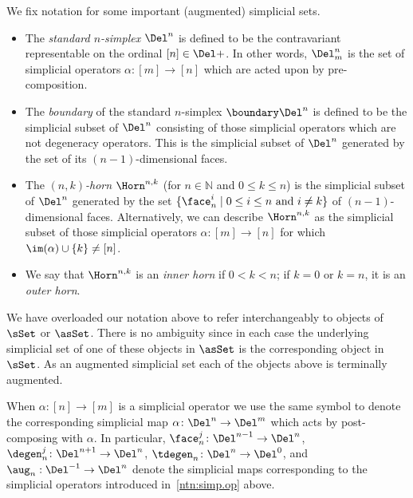     \begin{ntn}

        We fix notation for some important (augmented) simplicial sets. 
        \begin{itemize}
            \item The {\em standard $n$-simplex\/} $\Del^n$ is defined to be the contravariant representable on the ordinal $[n]\in\Del+$. In other words, $\Del^n_m$ is the set of simplicial operators $\alpha\colon[m]\to[n]$ which are acted upon by pre-composition.
            \item The {\em boundary\/} of the standard $n$-simplex $\boundary\Del^n$ is defined to be the simplicial subset of $\Del^n$ consisting of those simplicial operators which are not degeneracy operators. This is the simplicial subset of $\Del^n$ generated by the set of its $(n-1)$-dimensional faces.
            \item The {\em $(n,k)$-horn\/} $\Horn^{n,k}$ (for $n\in\mathbb{N}$ and $0\leq k\leq n$) is the simplicial subset of $\Del^n$ generated by the set $\{\face^i_n\mid 0\leq i\leq n \text{ and } i\neq k\}$ of $(n-1)$-dimensional faces.  Alternatively, we can describe $\Horn^{n,k}$ as the simplicial subset of those simplicial operators $\alpha\colon[m]\to[n]$ for which $\im(\alpha)\cup\{k\}\neq[n]$.
            \item We say that $\Horn^{n,k}$ is an {\em inner horn\/} if $0<k<n$; if $k=0$ or $k=n$, it is an {\em outer horn}.
        \end{itemize}

We have overloaded our notation above to refer interchangeably to objects of $\sSet$ or $\asSet$. There is no ambiguity since in each case the underlying simplicial set of one of these objects in $\asSet$ is  the corresponding object in $\sSet$. As an augmented simplicial set each of the objects above is terminally augmented.

        When $\alpha\colon [n]\to [m]$ is a simplicial operator we use the same symbol to denote the corresponding simplicial map $\alpha\colon\Del^n\to\Del^m$ which acts by post-composing with $\alpha$. In particular, $\face^j_n\colon\Del^{n-1}\to\Del^n$, $\degen^j_n\colon\Del^{n+1}\to\Del^n$,  $\tdegen_n\colon\Del^n\to\Del^0$, and $\aug_n:\Del^{-1}\to\Del^n$ denote the simplicial maps corresponding to the simplicial operators introduced in~\ref{ntn:simp.op} above.
    \end{ntn}

